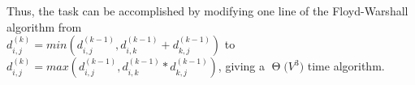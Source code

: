 \documentclass[11pts]{article}
\newcommand{\BigTheta}[1]{\ensuremath{\operatorname{\Theta}\bigl(#1\bigr)}}
\begin{document}
\begin{enumerate}
  Thus, the task can be accomplished by modifying one line of the
  Floyd-Warshall algorithm from \\
  $d_{i,j}^{(k)} = min( d_{i,j}^{(k-1)}, d_{i,k}^{(k-1)} + d_{k,j}^{(k-1)} )$
  to \\
  $d_{i,j}^{(k)} = max( d_{i,j}^{(k-1)}, d_{i,k}^{(k-1)} * d_{k,j}^{(k-1)} )$,
  giving a \BigTheta{V^{3}} time algorithm.

\end{enumerate}
\end{document}
